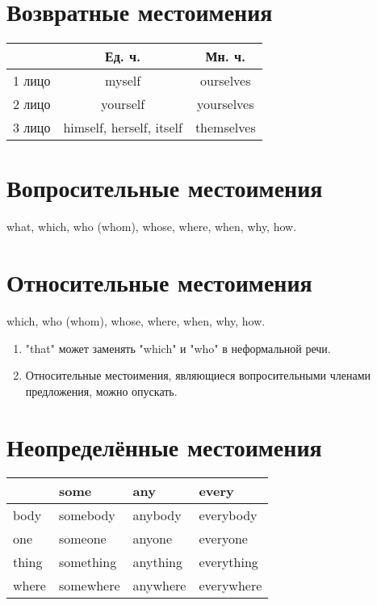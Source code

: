 \documentclass[oneside]{book}
\begin{document}
    \section{Возвратные местоимения}
    \begin{center}
        \begin{tabular}{|c|c|c|}
            \hline

            & Ед. ч. & Мн. ч.
            \\
            \hline

            1 лицо & myself & ourselves
            \\
            \hline

            2 лицо & yourself & yourselves
            \\
            \hline

            3 лицо & himself, herself, itself & themselves
            \\
            \hline
        \end{tabular}
    \end{center}

    \section{Вопросительные местоимения}
    what, which, who (whom), whose,
    where, when, why, how.

    \section{Относительные местоимения}
    which, who (whom), whose,
    where, when, why, how.

    \begin{enumerate}
        \item "that"{ }может заменять "which"{ }и "who"{ }
        в неформальной речи.

        \item Относительные местоимения,
        являющиеся вопросительными членами
        предложения, можно опускать.
    \end{enumerate}

    \section{Неопределённые местоимения}
    \begin{center}
        \begin{tabular}{|l|l|l|l|}
        \hline
              & some      & any      & every      \\ \hline
        body  & somebody  & anybody  & everybody  \\ \hline
        one   & someone   & anyone   & everyone   \\ \hline
        thing & something & anything & everything \\ \hline
        where & somewhere & anywhere & everywhere \\ \hline
        \end{tabular}
    \end{center}
\end{document}
